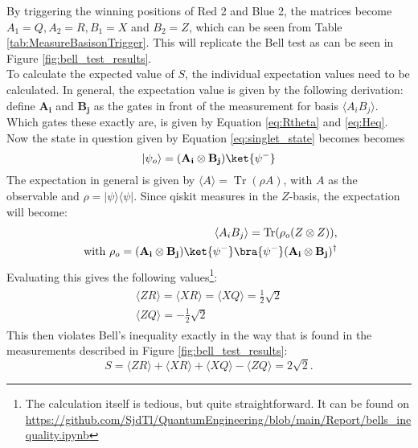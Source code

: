 \documentclass[final,5p,times,twocolumn,authoryear]{elsarticle}
\begin{document}
By triggering the winning positions of Red 2 and Blue 2, the matrices become $A_{1} = Q, A_{2} = R, B_{1} = X$ and $ B_{2} = Z $, which can be seen from Table \ref{tab:MeasureBasisonTrigger}. This will replicate the Bell test as can be seen in Figure \ref{fig:bell_test_results}. \\
To calculate the expected value of $S$, the individual expectation values need to be calculated. In general, the expectation value is given by the following derivation: define $\mathbf{A_{i}}$ and $\mathbf{B_j}$ as the gates in front of the measurement for basis $\langle A_iB_j \rangle$. Which gates these exactly are, is given by Equation \ref{eq:Rtheta} and \ref{eq:Heq}. Now the state in question given by Equation \ref{eq:singlet_state} becomes becomes
\begin{equation}
|\psi_o \rangle = (\mathbf{A_{i}} \otimes \mathbf{B_j})\ket{\psi^-}
\end{equation}
The expectation in general is given by $\langle A \rangle = \operatorname{Tr}(\rho A)$, with $A$ as the observable and $\rho=|\psi \rangle \langle \psi |$. Since qiskit measures in the $Z$-basis, the expectation will become:
\begin{align}
    \begin{split}
        \langle A_i B_j \rangle = \operatorname{Tr}(\rho_o (Z\otimes Z)), \\
        \text{ with } \rho_o= (\mathbf{A_{i}} \otimes \mathbf{B_j})\ket{\psi^-}\bra{\psi^-}(\mathbf{A_{i}} \otimes \mathbf{B_j})^\dagger
    \end{split}
\end{align}
Evaluating this gives the following values\footnote{The calculation itself is tedious, but quite straightforward. It can be found on \url{https://github.com/SjdTl/QuantumEngineering/blob/main/Report/bells_inequality.ipynb}}:
\begin{align}
    \begin{split}
        \langle ZR \rangle = \langle XR \rangle = \langle XQ \rangle = \tfrac{1}{2}\sqrt{2} \\
        \langle ZQ \rangle = - \tfrac{1}{2} \sqrt{2}
    \end{split}
\end{align}
This then violates Bell's inequality exactly in the way that is found in the measurements described in Figure \ref{fig:bell_test_results}:
\begin{equation}
    S=\langle ZR \rangle + \langle XR \rangle + \langle XQ \rangle - \langle ZQ \rangle = 2 \sqrt{2}
    \text{.}
\end{equation}
\end{document}
